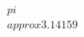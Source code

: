 \documentclass[preview]{standalone}
\begin{document}
\begin{align*}
\quad\\pi \quad\\approx 3.14159
\end{align*}
\end{document}
